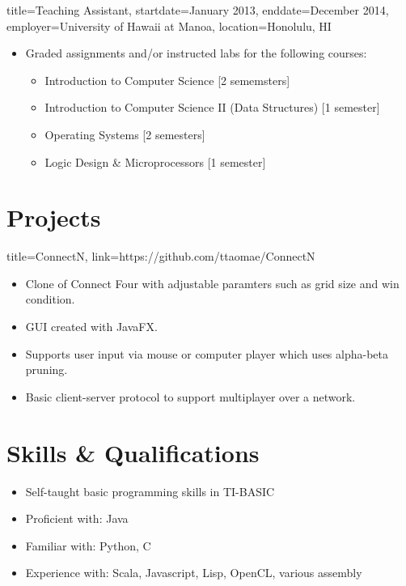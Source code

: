 \documentclass{resume}
\begin{document}
\begin{job}{title=Teaching Assistant,
            startdate=January 2013,
            enddate=December 2014,
            employer=University of Hawaii at Manoa,
            location={Honolulu, HI}}
    \begin{itemize}
        \item{Graded assignments and/or instructed labs for the following courses:}
        \begin{itemize}
            \item{Introduction to Computer Science [2 sememsters]}
            \item{Introduction to Computer Science II (Data Structures) [1 semester]}
            \item{Operating Systems [2 semesters]}
            \item{Logic Design \& Microprocessors [1 semester]}
        \end{itemize}
    \end{itemize}
\end{job}

\section*{Projects}
\begin{project}{title=ConnectN, link=https://github.com/ttaomae/ConnectN}
    \begin{itemize}
        \item{Clone of Connect Four with adjustable paramters such as grid size and win condition.}
        \item{GUI created with JavaFX.}
        \item{Supports user input via mouse or computer player which uses alpha-beta pruning.}
        \item{Basic client-server protocol to support multiplayer over a network.}
    \end{itemize}
\end{project}

\section*{Skills \& Qualifications}
\begin{itemize}
    \item{Self-taught basic programming skills in TI-BASIC}
\end{itemize}

\begin{itemize}
    \item{Proficient with: Java}
    \item{Familiar with: Python, C}
    \item{Experience with: Scala, Javascript, Lisp, OpenCL, various assembly}
\end{itemize}
\end{document}
